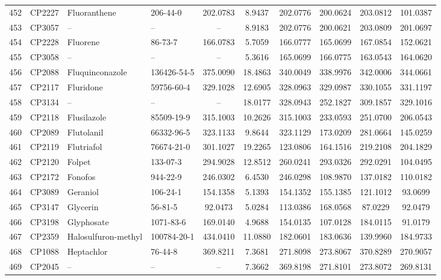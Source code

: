 \begin{longtable}{clllcccccc}
452 & CP2227 & Fluoranthene\smash{\textsuperscript{\textdaggerdbl}} & 206-44-0 & 202.0783 & 8.9437 & 202.0776 & 200.0624 & 203.0812 & 101.0387 \\ 
453 & CP3057 & – & – & – & 8.9183 & 202.0776 & 200.0621 & 203.0809 & 201.0697 \\ 
454 & CP2228 & Fluorene & 86-73-7 & 166.0783 & 5.7059 & 166.0777 & 165.0699 & 167.0854 & 152.0621 \\ 
455 & CP3058 & – & – & – & 5.3616 & 165.0699 & 166.0775 & 163.0543 & 164.0620 \\ 
456 & CP2088 & Fluquinconazole & 136426-54-5 & 375.0090 & 18.4863 & 340.0049 & 338.9976 & 342.0006 & 344.0661 \\ 
457 & CP2117 & Fluridone & 59756-60-4 & 329.1028 & 12.6905 & 328.0963 & 329.0987 & 330.1055 & 331.1197 \\ 
458 & CP3134 & – & – & – & 18.0177 & 328.0943 & 252.1827 & 309.1857 & 329.1016 \\ 
459 & CP2118 & Flusilazole & 85509-19-9 & 315.1003 & 10.2626 & 315.1003 & 233.0593 & 251.0700 & 206.0543 \\ 
460 & CP2089 & Flutolanil & 66332-96-5 & 323.1133 & 9.8644 & 323.1129 & 173.0209 & 281.0664 & 145.0259 \\ 
461 & CP2119 & Flutriafol & 76674-21-0 & 301.1027 & 19.2265 & 123.0806 & 164.1516 & 219.2108 & 204.1829 \\ 
462 & CP2120 & Folpet & 133-07-3 & 294.9028 & 12.8512 & 260.0241 & 293.0326 & 292.0291 & 104.0495 \\ 
463 & CP2172 & Fonofos & 944-22-9 & 246.0302 & 6.4530 & 246.0298 & 108.9870 & 137.0182 & 110.0182 \\ 
464 & CP3089 & Geraniol & 106-24-1 & 154.1358 & 5.1393 & 154.1352 & 155.1385 & 121.1012 & 93.0699 \\ 
465 & CP3147 & Glycerin\smash{\textsuperscript{\textdagger}}\smash{\textsuperscript{\textdaggerdbl}} & 56-81-5 & 92.0473 & 5.0284 & 113.0386 & 168.0568 & 87.0229 & 92.0479 \\ 
466 & CP3198 & Glyphosate & 1071-83-6 & 169.0140 & 4.9688 & 154.0135 & 107.0128 & 184.0115 & 91.0179 \\ 
467 & CP2359 & Halosulfuron-methyl & 100784-20-1 & 434.0410 & 11.0880 & 182.0601 & 183.0636 & 139.9960 & 184.9733 \\ 
468 & CP1088 & Heptachlor & 76-44-8 & 369.8211 & 7.3681 & 271.8098 & 273.8067 & 370.8289 & 270.9057 \\ 
469 & CP2045 & – & – & – & 7.3662 & 369.8198 & 271.8101 & 273.8072 & 269.8131 \\ 

\end{longtable}
